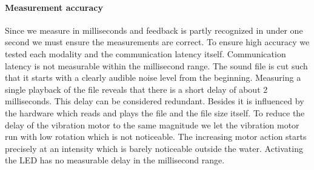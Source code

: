 \paragraph{Measurement accuracy}
Since we measure in milliseconds and feedback is partly recognized in under one second we must ensure the measurements are correct. To ensure high accuracy we tested each modality and the communication latency itself. Communication latency is not measurable within the millisecond range. 
The sound file is cut such that it starts with a clearly audible noise level from the beginning. Measuring a single playback of the file reveals that there is a short delay of about 2 milliseconds. 
This delay can be considered redundant. 
Besides it is influenced by the hardware which reads and plays the file and the file size itself. To reduce the delay of the vibration motor to the same magnitude we let the vibration motor run with low rotation which is not noticeable. The increasing motor action starts precisely at an intensity which is barely noticeable outside the water. Activating the LED has no measurable delay in the millisecond range.
























